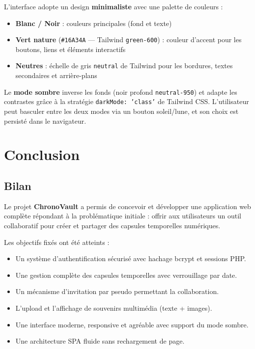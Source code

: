 \documentclass[12pt,a4paper]{report}
\begin{document}
L'interface adopte un design \textbf{minimaliste} avec une palette de couleurs :
\begin{itemize}[noitemsep]
    \item \textbf{Blanc / Noir} : couleurs principales (fond et texte)
    \item \textbf{Vert nature} (\texttt{\#16A34A} — Tailwind \texttt{green-600}) : couleur d'accent pour les boutons, liens et éléments interactifs
    \item \textbf{Neutres} : échelle de gris \texttt{neutral} de Tailwind pour les bordures, textes secondaires et arrière-plans
\end{itemize}

Le \textbf{mode sombre} inverse les fonds (noir profond \texttt{neutral-950}) et adapte les contrastes grâce à la stratégie \texttt{darkMode: 'class'} de Tailwind CSS. L'utilisateur peut basculer entre les deux modes via un bouton soleil/lune, et son choix est persisté dans le navigateur.


\chapter{Conclusion}

\section{Bilan}

Le projet \textbf{ChronoVault} a permis de concevoir et développer une application web complète répondant à la problématique initiale : offrir aux utilisateurs un outil collaboratif pour créer et partager des capsules temporelles numériques.

Les objectifs fixés ont été atteints :
\begin{itemize}[noitemsep]
    \item Un système d'authentification sécurisé avec hachage bcrypt et sessions PHP.
    \item Une gestion complète des capsules temporelles avec verrouillage par date.
    \item Un mécanisme d'invitation par pseudo permettant la collaboration.
    \item L'upload et l'affichage de souvenirs multimédia (texte + images).
    \item Une interface moderne, responsive et agréable avec support du mode sombre.
    \item Une architecture SPA fluide sans rechargement de page.
\end{itemize}
\end{document}
